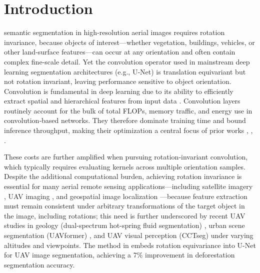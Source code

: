 \section{Introduction}
semantic segmentation in high‑resolution aerial images requires rotation invariance, because objects of interest—whether vegetation, buildings, vehicles, or other land‑surface features—can occur at any orientation and often contain complex fine‑scale detail. Yet the convolution operator used in mainstream deep learning segmentation architectures (e.g., U‑Net) is translation equivariant but not rotation invariant, leaving performance sensitive to object orientation. Convolution is fundamental in deep learning due to its ability to efficiently extract spatial and hierarchical features from input data \cite{cnn-survey}. Convolution layers routinely account for the bulk of total FLOPs, memory traffic, and energy use in convolution‑based networks. They therefore dominate training time and bound inference throughput, making their optimization a central focus of prior works \cite{FFT1}, \cite{winograd}, \cite{10286398}.


These costs are further amplified when pursuing rotation‑invariant convolution, which typically requires evaluating kernels across multiple orientation samples.
Despite the additional computational burden, achieving rotation invariance is essential for many aerial remote sensing applications—including satellite imagery \cite{satellite2,satellite3,satellite4}, UAV imaging \cite{UAV1}, and geospatial image localization \cite{geo1}—because feature extraction must remain consistent under arbitrary transformations of the target object in the image, including rotations; this need is further underscored by recent UAV studies in geology (dual-spectrum hot-spring fluid segmentation) \cite{YI2025661}, urban scene segmentation (UAVformer) \cite{YI2023109019}, and UAV visual perception (CCTseg) \cite{YI2023112612} under varying altitudes and viewpoints.
The method in \cite{mitton2021rotation} embeds rotation equivariance into U-Net for UAV image segmentation, achieving a 7\% improvement in deforestation segmentation accuracy. 


